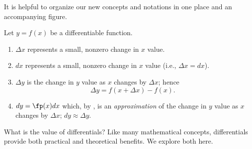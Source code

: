 It is helpful to organize our new concepts and notations in one place and an accompanying figure.


\begin{keyidea}\label{idea:differential}
Let $y = f(x)$ be a differentiable function. 
\begin{enumerate}
	\item $\Delta x$ represents a small, nonzero change in $x$ value.
	\item	$dx$ represents a small, nonzero change in $x$ value (i.e., $\Delta x = dx$).
	\item	$\Delta y$ is the change in $y$ value as $x$ changes by $\Delta x$; hence
	\[\Delta y = f(x+\Delta x)-f(x).\]
	\item		$dy = \fp(x)dx$ which, by , is an \emph{approximation} of the change in $y$ value as $x$ changes by $\Delta x$; $dy \approx \Delta y$.
\end{enumerate}
\end{keyidea}

What is the value of differentials? Like many mathematical concepts, differentials provide both practical and theoretical benefits. We explore both here.\\


